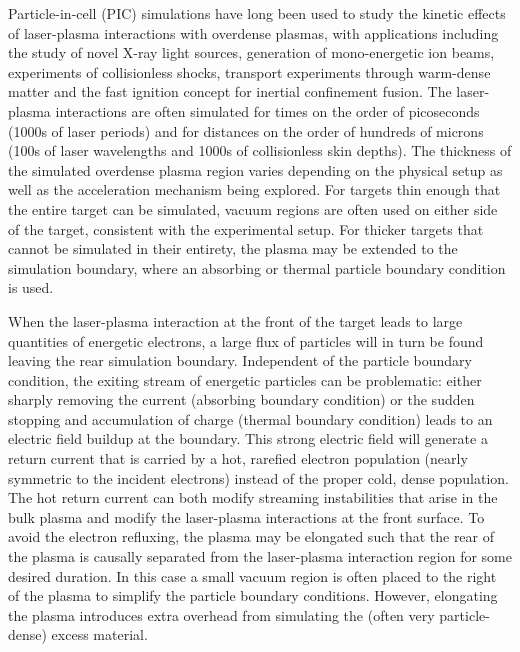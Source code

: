 \documentclass[../absorber.tex]{subfiles}
\begin{document}
Particle-in-cell (PIC) simulations have long been used to study the kinetic effects of laser-plasma interactions with overdense plasmas, with applications including the study of novel X-ray light sources,\cite{Watts2002DynamicsSpectra,Tsakiris2006RoutePulses,Park2006High-energyLasers,Ji2014EnergyInteraction,Capdessus2014Regime} generation of mono-energetic ion beams,\cite{Robinson2008RadiationPulses} experiments of collisionless shocks,\cite{Spitkovsky2008OnPlasmas,Martins2009IONSHOCKS,Fiuza2012Weibel-instability-mediatedLasers} transport experiments through warm-dense matter\cite{May2011MechanismInterface} and the fast ignition concept for inertial confinement fusion.\cite{Tabak1994IgnitionLasers,Tonge2009ALasers}  The laser-plasma interactions are often simulated for times on the order of picoseconds (1000s of laser periods) and for distances on the order of hundreds of microns (100s of laser wavelengths and 1000s of collisionless skin depths).  The thickness of the simulated overdense plasma region varies depending on the physical setup as well as the acceleration mechanism being explored.  For targets thin enough that the entire target can be simulated, vacuum regions are often used on either side of the target, consistent with the experimental setup.\cite{Silva2004ProtonInteractions,Sentoku2003AnomalousPlasma,Pukhov2001Three-DimensionalLaser,Lasinski1999Particle-in-cellApplications}  For thicker targets that cannot be simulated in their entirety, the plasma may be extended to the simulation boundary,\cite{Kemp2012InteractionPlasma,Yang1995AbsorptionBremsstrahlung,Pukhov1997LaserTargets,Wilks1993SimulationsInteractions} where an absorbing or thermal particle boundary condition is used.

When the laser-plasma interaction at the front of the target leads to large quantities of energetic electrons, a large flux of particles will in turn be found leaving the rear simulation boundary.  Independent of the particle boundary condition, the exiting stream of energetic particles can be problematic: either sharply removing the current (absorbing boundary condition) or the sudden stopping and accumulation of charge (thermal boundary condition) leads to an electric field buildup at the boundary.  This strong electric field will generate a return current that is carried by a hot, rarefied electron population (nearly symmetric to the incident electrons) instead of the proper cold, dense population.\cite{Bell1997Fast-electronExperiments}  The hot return current can both modify streaming instabilities that arise in the bulk plasma and modify the laser-plasma interactions at the front surface.   To avoid the electron refluxing, the plasma may be elongated such that the rear of the plasma is causally separated from the laser-plasma interaction region for some desired duration.\cite{Levy2013ConservationInteractions,Adam2006DispersionPlasmas}  In this case a small vacuum region is often placed to the right of the plasma to simplify the particle boundary conditions.  However, elongating the plasma introduces extra overhead from simulating the (often very particle-dense) excess material.
\end{document}
